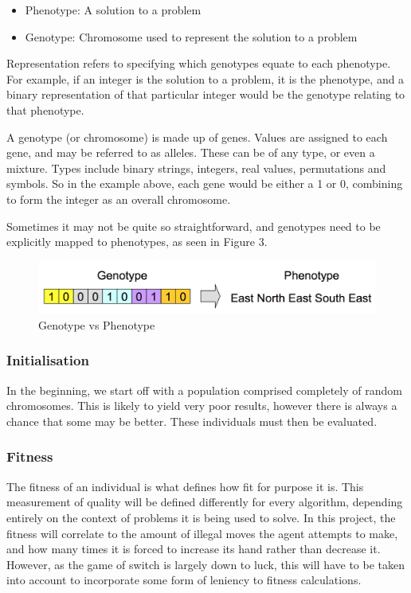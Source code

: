\documentclass[12pt,a4paper]{article}
\begin{document}

\begin{itemize}
	\item Phenotype: A solution to a problem
	\item Genotype: Chromosome used to represent the solution to a problem
\end{itemize}

Representation refers to specifying which genotypes equate to each phenotype\citep{IntroductionToEvolutionaryComputing}. For example, if an integer is the solution to a problem, it is the phenotype, and a binary representation of that particular integer would be the genotype relating to that phenotype. 

A genotype (or chromosome) is made up of genes. Values are assigned to each gene, and may be referred to as alleles. These can be of any type, or even a mixture. Types include binary strings, integers, real values, permutations and symbols. So in the example above, each gene would be either a 1 or 0, combining to form the integer as an overall chromosome.

Sometimes it may not be quite so straightforward, and genotypes need to be explicitly mapped to phenotypes, as seen in Figure 3. 

\begin{figure}[h]
	\centering
	\includegraphics[width = \textwidth]{GenoToPheno.png}
	\caption{Genotype vs Phenotype}
\end{figure}


\subsubsection{Initialisation}
In the beginning, we start off with a population comprised completely of random chromosomes. This is likely to yield very poor results, however there is always a chance that some may be better. These individuals must then be evaluated.

\subsubsection{Fitness}
The fitness of an individual is what defines how fit for purpose it is. This measurement of quality will be defined differently for every algorithm, depending entirely on the context of problems it is being used to solve. In this project, the fitness will correlate to the amount of illegal moves the agent attempts to make, and how many times it is forced to increase its hand rather than decrease it. However, as the game of switch is largely down to luck, this will have to be taken into account to incorporate some form of leniency to fitness calculations.  
\end{document}
